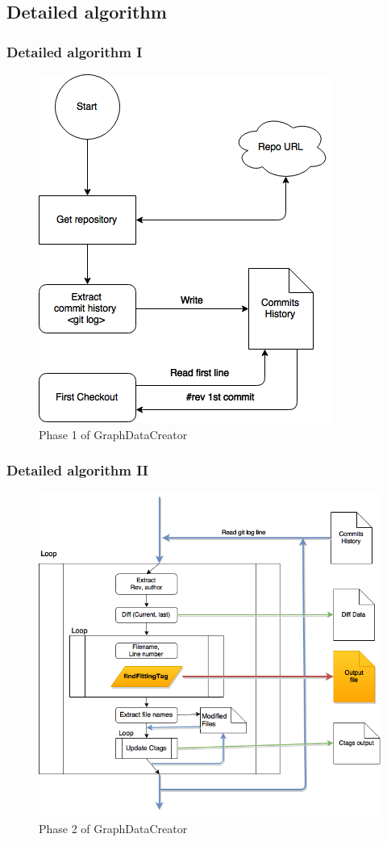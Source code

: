 \documentclass{beamer}
\begin{document}
\subsection{Detailed algorithm}

\begin{frame}
\frametitle{Detailed algorithm I}
\begin{figure}
\includegraphics[scale=0.4]{GDCphase1.png} 
\caption{Phase 1 of GraphDataCreator}
\label{fig:phase1}
\end{figure}
\end{frame}


\begin{frame}
\frametitle{Detailed algorithm II}
\begin{figure}
\includegraphics[scale=0.3]{GDCphase2.png} 
\caption{Phase 2 of GraphDataCreator}
\label{fig:phase2}
\end{figure}
\end{frame}
\end{document}
